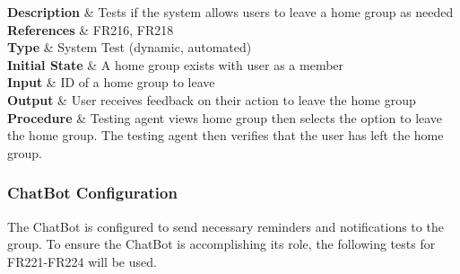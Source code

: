 \documentclass[12pt, titlepage]{article}
\begin{document}
\begin{center}
{    \textbf{Description} & Tests if the system allows users to leave a home group as needed \\ 

    \textbf{References} & FR216, FR218 \\ 

    \textbf{Type} & System Test (dynamic, automated) \\ 

    \textbf{Initial State} & A home group exists with user as a member \\ 

    \textbf{Input} & ID of a home group to leave\\ 

    \textbf{Output} & User receives feedback on their action to leave the home group \\ 

    \textbf{Procedure} & Testing agent views home group then selects the option to leave the home group. The testing agent then verifies that the user has left the home group. \\ 
  }

\end{center}

\subsubsection{ChatBot Configuration}
The ChatBot is configured to send necessary reminders and notifications to the group. To ensure the ChatBot is accomplishing its role, the following tests for FR221-FR224 will be used.
\end{document}

